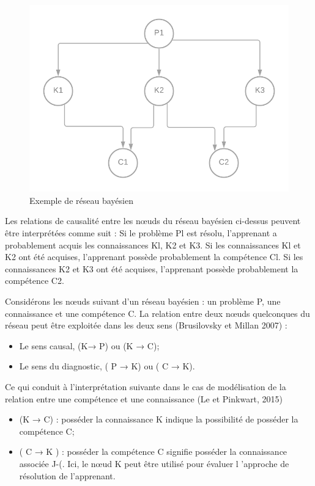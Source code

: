 \begin{figure}[H]
    \centering
    \includegraphics[width=\textwidth]{figures/r_by.png}
        \captionsetup{justification=centering}
    \caption{Exemple de réseau bayésien}
    \label{fig:r_by}
\end{figure}

Les relations de causalité entre les nœuds du réseau bayésien ci-dessus peuvent être interprétées comme suit : Si le problème Pl est résolu, l'apprenant a probablement acquis les connaissances Kl, K2 et K3. Si les connaissances Kl et K2 ont été acquises, l'apprenant possède probablement la compétence Cl. Si les connaissances K2 et K3 ont été acquises, l'apprenant possède probablement la compétence C2. 

Considérons les nœuds suivant d'un réseau bayésien : un problème P, une connaissance et une compétence C. La relation entre deux nœuds quelconques du réseau peut être exploitée dans les deux sens (Brusilovsky et Millan 2007) : 
\begin{itemize}
\item Le sens causal, (K→ P) ou (K → C); 
\item Le sens du diagnostic, ( P → K) ou ( C → K). 
\end{itemize}

Ce qui conduit à l'interprétation suivante dans le cas de modélisation de la relation entre une compétence et une connaissance (Le et Pinkwart, 2015) 
\begin{itemize}
\item  (K → C) : posséder la connaissance K indique la possibilité de posséder la compétence C;
\item ( C → K ) : posséder la compétence C signifie posséder la connaissance associée J-(. Ici, le nœud K peut être utilisé pour évaluer l 'approche de résolution de l'apprenant.  
\end{itemize}
